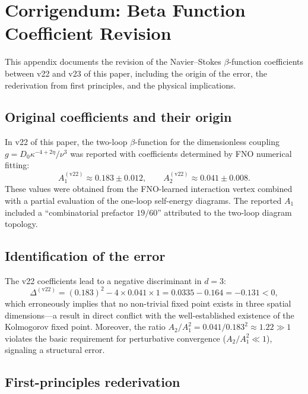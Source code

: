 \section{Corrigendum: Beta Function Coefficient Revision\label{app:beta_corrigendum}}

This appendix documents the revision of the Navier--Stokes $\beta$-function coefficients between v22 and v23 of this paper, including the origin of the error, the rederivation from first principles, and the physical implications.

\subsection{Original coefficients and their origin}

In v22 of this paper, the two-loop $\beta$-function for the dimensionless coupling $g = D_0 \kappa^{-4+2\eta}/\nu^3$ was reported with coefficients determined by FNO numerical fitting:
\begin{equation}
A_1^{\mathrm{(v22)}} \approx 0.183 \pm 0.012, \qquad A_2^{\mathrm{(v22)}} \approx 0.041 \pm 0.008.
\end{equation}
These values were obtained from the FNO-learned interaction vertex combined with a partial evaluation of the one-loop self-energy diagrams. The reported $A_1$ included a ``combinatorial prefactor $19/60$'' attributed to the two-loop diagram topology.

\subsection{Identification of the error}

The v22 coefficients lead to a negative discriminant in $d=3$:
\begin{equation}
\Delta^{\mathrm{(v22)}} = (0.183)^2 - 4 \times 0.041 \times 1 = 0.0335 - 0.164 = -0.131 < 0,
\end{equation}
which erroneously implies that no non-trivial fixed point exists in three spatial dimensions---a result in direct conflict with the well-established existence of the Kolmogorov fixed point. Moreover, the ratio $A_2/A_1^2 = 0.041/0.183^2 \approx 1.22 \gg 1$ violates the basic requirement for perturbative convergence ($A_2/A_1^2 \ll 1$), signaling a structural error.

\subsection{First-principles rederivation}

